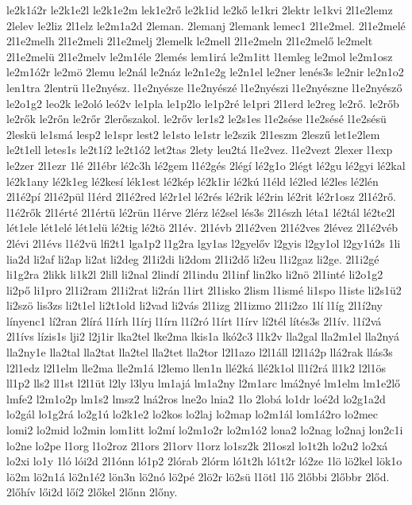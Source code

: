 {le2k1á2r
le2k1e2l
le2k1e2m
lek1e2rő
le2k1id
le2kő
le1kri
2lektr
le1kvi
2l1e2lemz
2lelev
le2liz
2l1elz
le2m1a2d
2leman.
2lemanj
2lemank
lemec1
2l1e2mel.
2l1e2melé
2l1e2melh
2l1e2meli
2l1e2melj
2lemelk
le2mell
2l1e2meln
2l1e2melő
le2melt
2l1e2melü
2l1e2melv
le2m1éle
2lemés
lem1irá
le2m1itt
l1emleg
le2mol
le2m1osz
le2m1ó2r
le2mö
2lemu
le2nál
le2náz
le2n1e2g
le2n1el
le2ner
lenés3s
le2nir
le2n1o2
len1tra
2lentrü
l1e2nyész.
l1e2nyésze
l1e2nyészé
l1e2nyészi
l1e2nyészne
l1e2nyésző
le2o1g2
leo2k
le2oló
leó2v
le1pla
le1p2lo
le1p2ré
le1pri
2l1erd
le2reg
le2rő.
le2rőb
le2rők
le2rőn
le2rőr
2lerőszakol.
le2rőv
ler1s2
le2s1es
l1e2sése
l1e2sésé
l1e2sésü
2leskü
le1smá
lesp2
le1spr
lest2
le1sto
le1str
le2szik
2l1eszm
2leszű
let1e2lem
le2t1ell
letes1s
le2t1í2
le2t1ó2
let2tas
2lety
leu2tá
l1e2vez.
l1e2vezt
2lexer
l1exp
le2zer
2l1ezr
1lé
2l1ébr
lé2c3h
lé2gem
l1é2gés
2légí
lé2g1o
2légt
lé2gu
lé2gyi
lé2kal
lé2k1any
lé2k1eg
lé2kesí
lék1est
lé2kép
lé2k1ir
lé2kú
l1éld
lé2led
lé2les
lé2lén
2l1é2pí
2l1é2pül
l1érd
2l1é2red
lé2r1el
lé2rés
lé2rik
lé2rin
lé2rit
lé2r1osz
2l1é2rő.
l1é2rők
2l1érté
2l1értü
lé2rün
l1érve
2lérz
lé2sel
lés3s
2l1észh
léta1
lé2tál
lé2te2l
lét1ele
lét1elé
lét1elü
lé2tig
lé2tö
2l1év.
2l1évb
2l1é2ven
2l1é2ves
2lévez
2l1é2véb
2lévi
2l1évs
l1é2vü
lfi2t1
lga1p2
l1g2ra
lgy1as
l2gyelőv
l2gyis
l2gy1ol
l2gy1ú2s
1li
lia2d
li2af
li2ap
li2at
li2deg
2l1i2di
li2dom
2l1i2dő
li2eu
l1i2gaz
li2ge.
2l1i2gé
li1g2ra
2likk
li1k2l
2lill
li2nal
2lindí
2l1indu
2l1inf
lin2ko
li2nö
2l1inté
li2o1g2
li2pő
li1pro
2l1i2ram
2l1i2rat
li2rán
l1irt
2l1isko
2lism
l1ismé
li1spo
l1iste
li2s1ü2
li2szö
lis3zs
li2t1el
li2t1old
li2vad
li2vás
2l1izg
2l1izmo
2l1i2zo
1lí
l1íg
2l1í2ny
línyenc1
lí2ran
2lírá
l1írh
l1írj
l1írn
l1í2ró
l1írt
l1írv
lí2tél
lítés3s
2l1ív.
l1í2vá
2l1ívs
lízis1s
lji2
l2j1ir
lka2tel
lke2ma
lkis1a
lkó2c3
l1k2v
lla2gal
lla2m1el
lla2nyá
lla2ny1e
lla2tal
lla2tat
lla2tel
lla2tet
lla2tor
l2l1azo
l2l1áll
l2l1á2p
llá2rak
llás3s
l2l1edz
l2l1elm
lle2ma
lle2m1á
l2lemo
llen1n
llé2ká
llé2k1ol
ll1í2rá
ll1k2
l2l1ös
ll1p2
lls2
ll1st
l2l1üt
l2ly
l3lyu
lm1ajá
lm1a2ny
l2m1arc
lmá2nyé
lm1elm
lm1e2lő
lmfe2
l2m1o2p
lm1s2
lmsz2
lná2ros
lne2o
lnia2
1lo
2lobá
lo1dr
loé2d
lo2g1a2d
lo2gál
lo1g2rá
lo2g1ú
lo2k1e2
lo2kos
lo2laj
lo2map
lo2m1ál
lom1á2ro
lo2mec
lomi2
lo2mid
lo2min
lom1itt
lo2mí
lo2m1o2r
lo2m1ó2
lona2
lo2nag
lo2naj
lon2c1i
lo2ne
lo2pe
l1org
l1o2roz
2l1ors
2l1orv
l1orz
lo1sz2k
2l1oszl
lo1t2h
lo2u2
lo2xá
lo2xi
lo1y
1ló
lói2d
2l1ónn
ló1p2
2lórab
2lórm
ló1t2h
ló1t2r
ló2ze
1lö
lö2kel
lök1o
lö2m
lö2n1á
lö2n1é2
lön3n
lö2nó
lö2pé
2lö2r
lö2sü
l1ötl
1lő
2lőbbi
2lőbbr
2lőd.
2lőhív
lői2d
lőí2
2lőkel
2lőnn
2lőny.
}
